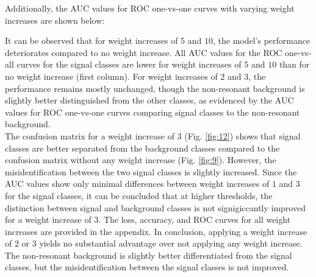 Additionally, the AUC values for ROC one-vs-one curves with varying weight increases are shown below:



It can be observed that for weight increases of $5$ and $10$, the model's performance deteriorates compared to no weight increase. All AUC values for the ROC one-vs-all curves for the signal classes are lower
for weight increases of $5$ and $10$ than for no weight increase (first column). For weight increases of $2$ and $3$, the performance remains mostly unchanged, though the non-resonant background is slightly better
distinguished from the other classes, as evidenced by the AUC values for ROC one-vs-one curves comparing signal classes to the non-resonant background. \\

The confusion matrix for a weight increase of $3$ (Fig. \ref{fig:12}) shows that signal classes are better separated from the background classes compared to the confusion matrix without any weight
increase (Fig. \ref{fig:9}). However, the misidentification between the two signal classes is slightly increased. Since the AUC values show only minimal differences between weight increases of $1$ and $3$ for the signal classes,
it can be
concluded that at higher thresholds, the distinction between signal and background classes is not signigiccantly improved for a weight increase of $3$. The loss, accuracy, and ROC curves for all weight increases are
provided in the appendix. In conclusion, applying a weight increase of $2$ or $3$ yields no substantial advantage over not applying any weight increase. The non-resonant background is slightly better
differentiated from the signal classes, but the misidentification between the signal classes is not improved. \\

